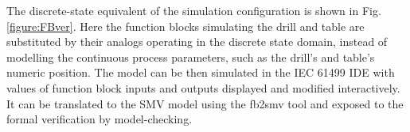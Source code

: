 \documentclass[conference]{IEEEtran}
\begin{document}






The discrete-state equivalent of the simulation configuration is shown in Fig. \ref{figure:FBver}. Here the function blocks simulating the drill and table are substituted by their analogs operating in the discrete state domain, instead of modelling the continuous process parameters, such as the drill's and table's numeric position.
The model can be then simulated in the IEC 61499 IDE with values of function block inputs and outputs displayed and modified interactively. It can be translated to the SMV model using the fb2smv tool and exposed to the formal verification by model-checking. 


\end{document}
